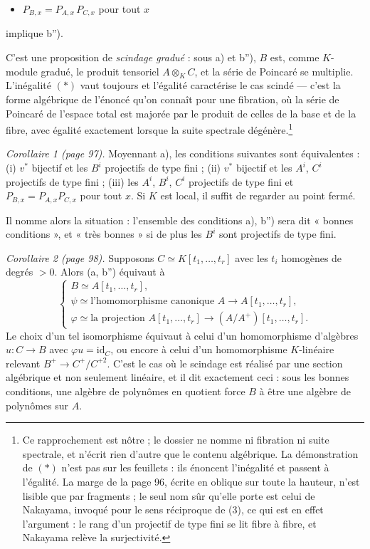 \documentclass[11pt,a4paper]{article}
\begin{document}
\begin{itemize}
  \item[c)] $P_{B,x} = P_{A,x}\, P_{C,x}$ pour tout $x$
\end{itemize}

implique b'').

C'est une proposition de \emph{scindage gradué} : sous a) et b''), $B$ est,
comme $K$-module gradué, le produit tensoriel $A \otimes_{K} C$, et la série de
Poincaré se multiplie. L'inégalité $(*)$ vaut toujours et l'égalité caractérise
le cas scindé — c'est la forme algébrique de l'énoncé qu'on connaît pour une
fibration, où la série de Poincaré de l'espace total est majorée par le produit
de celles de la base et de la fibre, avec égalité exactement lorsque la suite
spectrale dégénère.\footnote{Ce rapprochement est nôtre ; le dossier ne nomme
ni fibration ni suite spectrale, et n'écrit rien d'autre que le contenu
algébrique. La démonstration de $(*)$ n'est pas sur les feuillets : ils énoncent
l'inégalité et passent à l'égalité. La marge de la page 96, écrite en oblique
sur toute la hauteur, n'est lisible que par fragments ; le seul nom sûr qu'elle
porte est celui de Nakayama, invoqué pour le sens réciproque de (3), ce qui est
en effet l'argument : le rang d'un projectif de type fini se lit fibre à fibre,
et Nakayama relève la surjectivité.}

\emph{Corollaire 1 (page 97).} Moyennant a), les conditions suivantes sont
équivalentes : (i) $v^{*}$ bijectif et les $B^{i}$ projectifs de type fini ;
(ii) $v^{*}$ bijectif et les $A^{i}$, $C^{i}$ projectifs de type fini ; (iii)
les $A^{i}$, $B^{i}$, $C^{i}$ projectifs de type fini et $P_{B,x} = P_{A,x}
P_{C,x}$ pour tout $x$. Si $K$ est local, il suffit de regarder au point fermé.

Il nomme alors la situation : l'ensemble des conditions a), b'') sera dit
« bonnes conditions », et « très bonnes » si de plus les $B^{i}$ sont projectifs
de type fini.

\emph{Corollaire 2 (page 98).} Supposons $C \simeq K[t_{1},\ldots,t_{r}]$ avec
les $t_{i}$ homogènes de degrés $> 0$. Alors (a, b'') équivaut à
\[
  \begin{cases}
    B \simeq A[t_{1},\ldots,t_{r}] , \\
    \psi \simeq \text{l'homomorphisme canonique } A \to A[t_{1},\ldots,t_{r}] , \\
    \varphi \simeq \text{la projection } A[t_{1},\ldots,t_{r}] \to
      (A/A^{+})[t_{1},\ldots,t_{r}] .
  \end{cases}
\]
Le choix d'un tel isomorphisme équivaut à celui d'un homomorphisme d'algèbres
$u : C \to B$ avec $\varphi u = \mathrm{id}_{C}$, ou encore à celui d'un
homomorphisme $K$-linéaire relevant $B^{+} \to C^{+}/C^{+2}$. C'est le cas où le
scindage est réalisé par une section algébrique et non seulement linéaire, et il
dit exactement ceci : sous les bonnes conditions, une algèbre de polynômes en
quotient force $B$ à être une algèbre de polynômes sur $A$.
\end{document}
